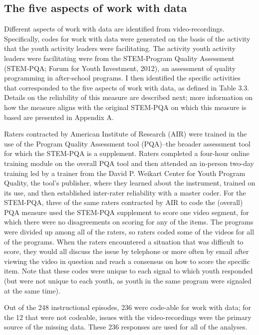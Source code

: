\documentclass[]{book}
\theoremstyle{definition}
\theoremstyle{definition}
\theoremstyle{definition}
\theoremstyle{remark}
\begin{document}
\subsection{The five aspects of work with
data}\label{the-five-aspects-of-work-with-data}

Different aspects of work with data are identified from
video-recordings. Specifically, codes for work with data were generated
on the basis of the activity that the youth activity leaders were
facilitating. The activity youth activity leaders were facilitating were
from the STEM-Program Quality Assessment (STEM-PQA; Forum for Youth
Investment, 2012), an assessment of quality programming in after-school
programs. I then identified the specific activities that corresponded to
the five aspects of work with data, as defined in Table 3.3. Details on
the reliability of this measure are described next; more information on
how the measure aligns with the original STEM-PQA on which this measure
is based are presented in Appendix A.

Raters contracted by American Institute of Research (AIR) were trained
in the use of the Program Quality Assessment tool (PQA)--the broader
assessment tool for which the STEM-PQA is a supplement. Raters completed
a four-hour online training module on the overall PQA tool and then
attended an in-person two-day training led by a trainer from the David
P. Weikart Center for Youth Program Quality, the tool's publisher, where
they learned about the instrument, trained on its use, and then
established inter-rater reliability with a master coder. For the
STEM-PQA, three of the same raters contracted by AIR to code the
(overall) PQA measure used the STEM-PQA supplement to score one video
segment, for which there were no disagreements on scoring for any of the
items. The programs were divided up among all of the raters, so raters
coded some of the videos for all of the programs. When the raters
encountered a situation that was difficult to score, they would all
discuss the issue by telephone or more often by email after viewing the
video in question and reach a consensus on how to score the specific
item. Note that these codes were unique to each signal to which youth
responded (but were not unique to each youth, as youth in the same
program were signaled at the same time).

Out of the 248 instructional episodes, 236 were code-able for work with
data; for the 12 that were not codeable, issues with the
video-recordings were the primary source of the missing data. These 236
responses are used for all of the analyses.
\end{document}
